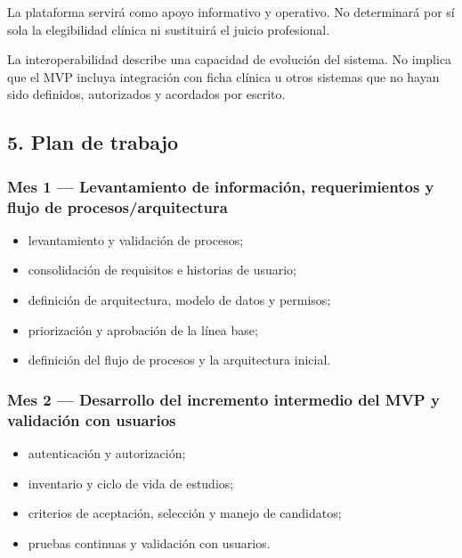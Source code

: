 \documentclass[
]{article}
\providecommand{\tightlist}{%
  \setlength{\itemsep}{0pt}\setlength{\parskip}{0pt}}
\begin{document}
La plataforma servirá como apoyo informativo y operativo. No determinará
por sí sola la elegibilidad clínica ni sustituirá el juicio profesional.

La interoperabilidad describe una capacidad de evolución del sistema. No
implica que el MVP incluya integración con ficha clínica u otros
sistemas que no hayan sido definidos, autorizados y acordados por
escrito.

\hypertarget{5-plan-de-trabajo}{%
\subsection{5. Plan de trabajo}\label{5-plan-de-trabajo}}

\hypertarget{mes-1--levantamiento-de-informaciuxf3n-requerimientos-y-flujo-de-procesosarquitectura}{%
\subsubsection{Mes 1 --- Levantamiento de información, requerimientos y
flujo de
procesos/arquitectura}\label{mes-1--levantamiento-de-informaciuxf3n-requerimientos-y-flujo-de-procesosarquitectura}}

\begin{itemize}
\tightlist
\item
  levantamiento y validación de procesos;
\item
  consolidación de requisitos e historias de usuario;
\item
  definición de arquitectura, modelo de datos y permisos;
\item
  priorización y aprobación de la línea base;
\item
  definición del flujo de procesos y la arquitectura inicial.
\end{itemize}

\hypertarget{mes-2--desarrollo-del-incremento-intermedio-del-mvp-y-validaciuxf3n-con-usuarios}{%
\subsubsection{Mes 2 --- Desarrollo del incremento intermedio del MVP y
validación con
usuarios}\label{mes-2--desarrollo-del-incremento-intermedio-del-mvp-y-validaciuxf3n-con-usuarios}}

\begin{itemize}
\tightlist
\item
  autenticación y autorización;
\item
  inventario y ciclo de vida de estudios;
\item
  criterios de aceptación, selección y manejo de candidatos;
\item
  pruebas continuas y validación con usuarios.
\end{itemize}
\end{document}
